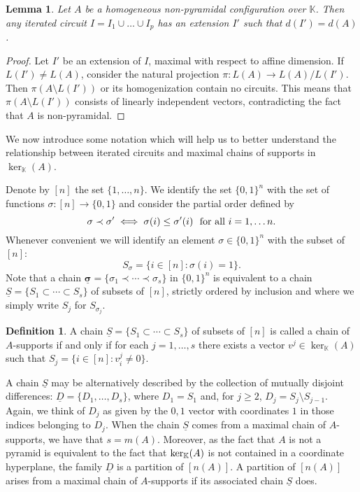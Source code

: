 \documentclass[11pt]{amsart}
\theoremstyle{plain}
\newtheorem{lemma}[theorem]{Lemma}
\theoremstyle{definition}
\newtheorem{definition}[theorem]{Definition}
\theoremstyle{remark}
\renewcommand{\k}{{\mathbb K}}
\newcommand{\csig}{\ensuremath{\underline{\mathbf \sigma}}}
\newcommand{\cset}{\underline{S}}
\newcommand{\cdiff}{\underline{D}}
\numberwithin{equation}{section}
\begin{document}
\begin{lemma} \label{lem:imax}
Let $A$ be a homogeneous non-pyramidal configuration over $\k$. Then 
 any iterated circuit $I=I_1 \cup \dots \cup I_p$ has an extension $I'$ such that $d(I')=d(A)$.  
\end{lemma}

\begin{proof} Let $I'$ be an extension of $I$, maximal with respect to affine dimension.  
If $L(I') \not= L(A)$,  consider the natural projection
$\pi \colon L(A) \to L(A)/L(I')$. Then $\pi(A \setminus L(I'))$ 
 or its homogenization contain no circuits.  This means that $\pi(A \setminus L(I'))$ consists
  of linearly independent vectors, contradicting the fact that $A$ is non-pyramidal.  
\end{proof}

We now introduce some notation which will help us to better understand
the relationship between iterated circuits and  maximal chains of supports in $\ker_\k(A)$.  

Denote by $[n]$ the set $\{1,\dots,n\}$.  We identify the set 
$\{0,1\}^n$  with the set of functions 
$\sigma \colon [n] \to \{0,1\}$
and consider the partial order defined by
$$\sigma \prec \sigma' \iff \sigma(i) \leq \sigma'(i)\ \hbox {\ for all\ } i = 1,
\dots n.$$
Whenever convenient we will identify an element $\sigma \in \{0,1\}^n$ with the subset of $[n]$:
$$ S_\sigma = \{i \in [n] : \sigma(i) = 1\}.$$
Note that a chain 
$\csig = \{\sigma_1  \prec \cdots \prec \sigma_s\}$
in $\{0,1\}^n$ is equivalent to a chain
$\cset = \{S_1 \subset \cdots \subset S_s\}$
of subsets of $[n]$, strictly ordered by inclusion and where  we simply write $S_j$ for $S_{\sigma_j}$.

\begin{definition}\label{def:chain}
A chain $\cset = \{S_1   \subset \cdots \subset S_s\}$ of subsets of $[n]$ is called a chain of $A$-supports if and only if for each $j=1,\dots,s$ 
there exists a vector $v^j \in \ker_\k (A)$ such that
$S_j = \{i \in [n] : v^j_i\not= 0\}$.
\end{definition}
A chain $\cset$ may be alternatively described by the collection 
of mutually disjoint differences: 
$\cdiff = \{D_1,\dots,D_s\}$,
where $D_1 = S_1$ and, for $j \geq 2$, $D_j = S_j \setminus S_{j-1}$.  
Again, we think of $D_j$ as given by the $0,1$ vector with coordinates $1$ in those indices belonging to $D_j$.
When the chain $\cset$ comes from a maximal chain of $A$-supports, we have that $s=m(A)$.  Moreover, as the fact that $A$ is not a pyramid is 
equivalent to the fact that ${\rm ker}_\k(A)$ is not contained in a coordinate hyperplane, the family 
$\cdiff$ is a partition of $[n(A)]$.  A partition of $[n(A)]$ arises from a maximal chain of $A$-supports if its associated chain $\cset$ does.
\end{document}

